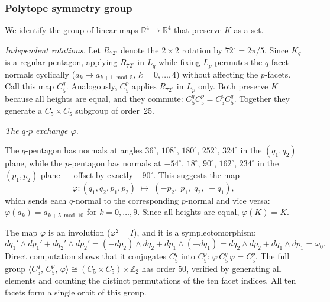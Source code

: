 \subsubsection*{Polytope symmetry group}

We identify the group of linear maps $\mathbb{R}^4 \to \mathbb{R}^4$
that preserve $K$ as a set.

\emph{Independent rotations.}
Let $R_{72^\circ}$ denote the $2{\times}2$ rotation by $72^\circ = 2\pi/5$.
Since $K_q$ is a regular pentagon, applying $R_{72^\circ}$ in $L_q$
while fixing $L_p$ permutes the $q$-facet normals cyclically
($a_k \mapsto a_{k+1\bmod 5}$, $k = 0, \ldots, 4$)
without affecting the $p$-facets.
Call this map $C_5^q$.
Analogously, $C_5^p$ applies $R_{72^\circ}$ in $L_p$ only.
Both preserve $K$ because all heights are equal, and they commute:
$C_5^q C_5^p = C_5^p C_5^q$.
Together they generate a $C_5 \times C_5$ subgroup of order~25.

\emph{The $q$\nobreakdash-$p$ exchange $\varphi$.}
\begin{unverified}
The $q$-pentagon has normals at angles
$36^\circ$, $108^\circ$, $180^\circ$, $252^\circ$, $324^\circ$
in the $(q_1, q_2)$ plane, while the $p$-pentagon has normals at
$-54^\circ$, $18^\circ$, $90^\circ$, $162^\circ$, $234^\circ$
in the $(p_1, p_2)$ plane --- offset by exactly $-90^\circ$.
This suggests the map
\[
  \varphi \colon (q_1, q_2, p_1, p_2)
  \;\mapsto\; (-p_2,\; p_1,\; q_2,\; -q_1),
\]
which sends each $q$-normal to the corresponding $p$-normal and vice
versa: $\varphi(a_k) = a_{k+5\bmod 10}$ for $k = 0, \ldots, 9$.
Since all heights are equal, $\varphi(K) = K$.

The map $\varphi$ is an involution ($\varphi^2 = I$), and it is a
symplectomorphism:
\[
  dq_1' \wedge dp_1' + dq_2' \wedge dp_2'
  = (-dp_2) \wedge dq_2 + dp_1 \wedge (-dq_1)
  = dq_2 \wedge dp_2 + dq_1 \wedge dp_1
  = \omega_0.
\]
Direct computation shows that it conjugates $C_5^q$ into $C_5^p$:
$\varphi \, C_5^q \, \varphi = C_5^p$.
The full group
$\langle C_5^q,\, C_5^p,\, \varphi \rangle
\cong (C_5 \times C_5) \rtimes \mathbb{Z}_2$
has order $50$, verified by generating all elements and
counting the distinct permutations of the ten facet indices.
All ten facets form a single orbit of this group.
\end{unverified}

